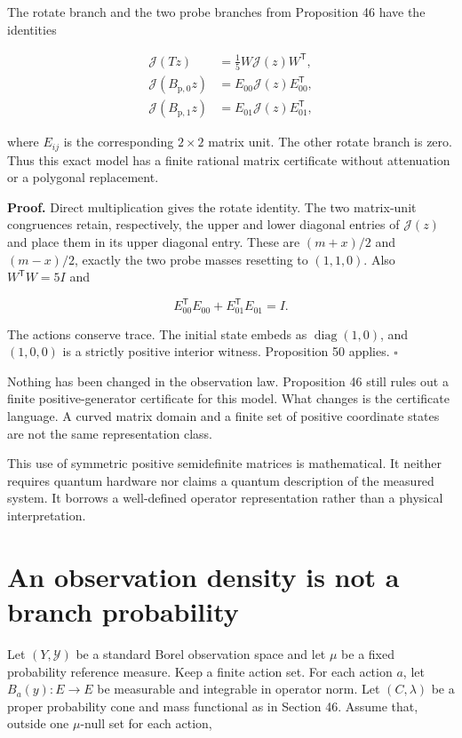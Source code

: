 The rotate branch and the two probe branches from Proposition 46 have
the identities

\[
\begin{aligned}
\mathcal J(Tz)&=\frac15W\mathcal J(z)W^{\mathsf T},\\
\mathcal J(B_{\mathrm p,0}z)&=E_{00}\mathcal J(z)E_{00}^{\mathsf T},\\
\mathcal J(B_{\mathrm p,1}z)&=E_{01}\mathcal J(z)E_{01}^{\mathsf T},
\end{aligned}
\]

where \(E_{ij}\) is the corresponding \(2\times2\) matrix unit. The
other rotate branch is zero. Thus this exact model has a finite rational
matrix certificate without attenuation or a polygonal replacement.

\textbf{Proof.} Direct multiplication gives the rotate identity. The two
matrix-unit congruences retain, respectively, the upper and lower
diagonal entries of \(\mathcal J(z)\) and place them in its upper
diagonal entry. These are \((m+x)/2\) and \((m-x)/2\), exactly the two
probe masses resetting to \((1,1,0)\). Also \(W^{\mathsf T}W=5I\) and

\[
E_{00}^{\mathsf T}E_{00}+E_{01}^{\mathsf T}E_{01}=I.
\]

The actions conserve trace. The initial state embeds as
\(\operatorname{diag}(1,0)\), and \((1,0,0)\) is a strictly positive
interior witness. Proposition 50 applies. \(\square\)

Nothing has been changed in the observation law. Proposition 46 still
rules out a finite positive-generator certificate for this model. What
changes is the certificate language. A curved matrix domain and a finite
set of positive coordinate states are not the same representation class.

This use of symmetric positive semidefinite matrices is mathematical. It
neither requires quantum hardware nor claims a quantum description of
the measured system. It borrows a well-defined operator representation
rather than a physical interpretation.

\section{An observation density is not a branch probability}\label{LSM:an-observation-density-is-not-a-branch-probability}

Let \((Y,\mathcal Y)\) be a standard Borel observation space and let
\(\mu\) be a fixed probability reference measure. Keep a finite action
set. For each action \(a\), let \(B_a(y):E\to E\) be measurable and
integrable in operator norm. Let \((C,\lambda)\) be a proper probability
cone and mass functional as in Section 46. Assume that, outside one
\(\mu\)-null set for each action,

